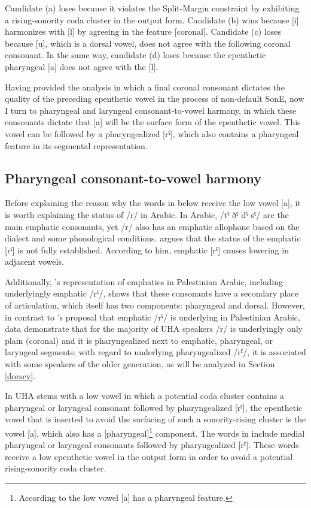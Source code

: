 \documentclass[output=paper,colorlinks,citecolor=brown]{langscibook}
\begin{document}
Candidate (a) loses because it violates the Split-Margin constraint by exhibiting a rising-sonority coda cluster in the output form. Candidate (b) wins because [i] harmonizes with [l] by agreeing in the feature [coronal]. Candidate (c) loses because [u], which is a dorsal vowel, does not agree with the following coronal consonant. In the same way, candidate (d) loses because the epenthetic pharyngeal [a] does not agree with the [l].

Having provided the analysis in which a final coronal consonant dictates the quality of the preceding epenthetic vowel in the process of non-default SonE, now I turn to pharyngeal and laryngeal consonant-to-vowel harmony, in which these consonants dictate that [a] will be the surface form of the epenthetic vowel. This vowel can be followed by a pharyngealized [rˤ], which also contains a pharyngeal feature in its segmental representation.

\subsection{Pharyngeal consonant-to-vowel harmony}
Before explaining the reason why the words in  below receive the low vowel [a], it is worth explaining the status of /r/ in Arabic. In Arabic, /tˤ ðˤ dˤ sˤ/ are the main emphatic consonants, yet /r/ also has an emphatic allophone based on the dialect and some phonological conditions. \citet[121]{Younes1993} argues that the status of the emphatic [rˤ] is not fully established. According to him, emphatic [rˤ] causes lowering in adjacent vowels.

Additionally, \citeauthor{Herzallah1990}'s \citeyear{Herzallah1990} representation of emphatics in Palestinian Arabic, including underlyingly emphatic /rˤ/, shows that these consonants have a secondary place of articulation, which itself has two components: pharyngeal and dorsal. However, in contrast to \citeauthor{Herzallah1990}'s proposal that emphatic /rˤ/ is underlying in Palestinian Arabic, data demonstrate that for the majority of  UHA speakers /r/ is underlyingly only plain (coronal) and it is pharyngealized next to emphatic, pharyngeal, or laryngeal segments;  with regard to underlying pharyngealized /rˤ/, it is associated with some speakers of the older generation, as will be analyzed in Section \ref{dorscv}.

In UHA stems with a low vowel in which a potential coda cluster contains a pharyngeal or laryngeal consonant followed by pharyngealized [rˤ], the epenthetic vowel that is inserted to avoid the surfacing of such a sonority-rising cluster is the vowel [a], which also has a [pharyngeal]\footnote{{According to \citet{Herzallah1990} the low vowel [a] has a pharyngeal feature.}} component. The words in  include medial pharyngeal or laryngeal consonants followed by pharyngealized [rˤ]. These words receive a low epenthetic vowel in the output form in order to avoid a potential rising-sonority coda cluster.
\end{document}
